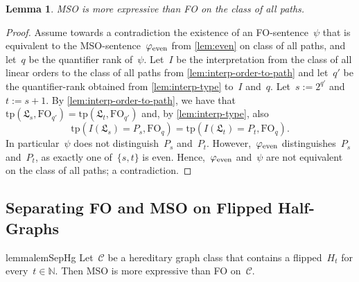 \documentclass[11pt]{article}      \usepackage[margin=1in]{geometry}  \usepackage{microtype}
\newtheorem{lemma}[theorem]{Lemma}
\theoremstyle{definition}
\newcommand{\N}[0]{\mathrm{\mathbb{N}}}
\newcommand{\tp}{\mathrm{tp}}
\newcommand{\FO}{\mathrm{FO}}
\newcommand{\struc}[1]{\mathfrak{#1}}
\newcommand{\CC}{\mathcal{C}}
\begin{document}
\begin{lemma}\label{lem:expressiveness-paths}
    MSO is more expressive than FO on the class of all paths.
\end{lemma}
\begin{proof}
    Assume towards a contradiction the existence of an FO-sentence~$\psi$ that is equivalent to the MSO-sentence~$\varphi_{\mathrm{even}}$ from \cref{lem:even} on class of all paths, and 
    let~$q$ be the quantifier rank of~$\psi$.
    Let~$I$ be the interpretation from the class of all linear orders to the class of all paths from \cref{lem:interp-order-to-path} and let~$q'$ be the quantifier-rank obtained from \cref{lem:interp-type} to~$I$ and~$q$.
    Let~$s:=2^{q'}$ and~$t := s + 1$.
    By \cref{lem:interp-order-to-path}, we have that~$\tp(\struc L_s, \FO_{q'}) = \tp(\struc L_t, \FO_{q'})$ and, by \cref{lem:interp-type}, also 
    \[
        \tp(I(\struc L_s) = P_s, \FO_{q}) = \tp(I(\struc L_t) = P_t, \FO_{q}).    
    \]
In particular~$\psi$ does not distinguish~$P_s$ and~$P_t$.
    However,~$\varphi_{\mathrm{even}}$ distinguishes~$P_s$ and~$P_t$, as exactly one of~$\{s,t\}$ is even.
    Hence,~$\varphi_{\mathrm{even}}$ and~$\psi$ are not equivalent on the class of all paths; a contradiction.
\end{proof}
 
\subsection{Separating FO and MSO on Flipped Half-Graphs}

\begin{restatable}{lemma}{lemSepHg}
    \label{lem:sep-hg}
    Let~$\CC$ be a hereditary graph class that contains a flipped~$H_t$ for every~$t\in\N$.
    Then MSO is more expressive than FO on~$\CC$.
\end{restatable}
\end{document}
